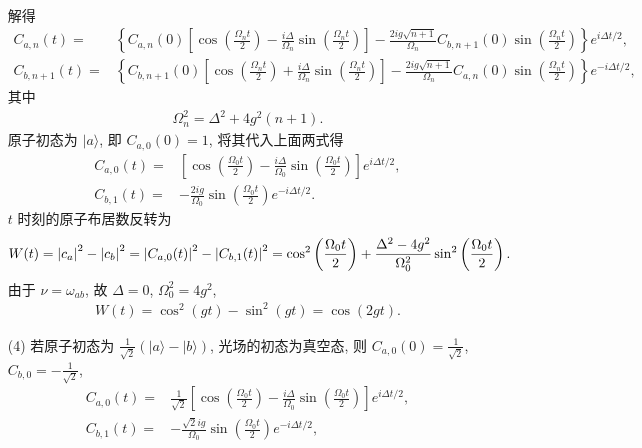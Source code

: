 \documentclass{assignment}
\begin{document}
\begin{sol}
\begin{itemize}
\begin{align}
        \end{align}
        解得
        \begin{align}
            C_{a,n}(t)=&\left\{C_{a,n}(0)\left[\cos\left(\frac{\Omega_nt}{2}\right)-\frac{i\Delta}{\Omega_n}\sin\left(\frac{\Omega_nt}{2}\right)\right]-\frac{2ig\sqrt{n+1}}{\Omega_n}C_{b,n+1}(0)\sin\left(\frac{\Omega_nt}{2}\right)\right\}e^{i\Delta t/2},\\
            C_{b,n+1}(t)=&\left\{C_{b,n+1}(0)\left[\cos\left(\frac{\Omega_nt}{2}\right)+\frac{i\Delta}{\Omega_n}\sin\left(\frac{\Omega_nt}{2}\right)\right]-\frac{2ig\sqrt{n+1}}{\Omega_n}C_{a,n}(0)\sin\left(\frac{\Omega_nt}{2}\right)\right\}e^{-i\Delta t/2},
        \end{align}
        其中
        \begin{align}
            \Omega_n^2=\Delta^2+4g^2(n+1).
        \end{align}
        原子初态为 $\lvert a\rangle$, 即 $C_{a,0}(0)=1$, 将其代入上面两式得
        \begin{align}
            C_{a,0}(t)=&\left[\cos\left(\frac{\Omega_0t}{2}\right)-\frac{i\Delta}{\Omega_0}\sin\left(\frac{\Omega_0t}{2}\right)\right]e^{i\Delta t/2},\\
            C_{b,1}(t)=&-\frac{2ig}{\Omega_0}\sin\left(\frac{\Omega_0t}{2}\right)e^{-i\Delta t/2}.
        \end{align}
        $t$ 时刻的原子布居数反转为
        \begin{align}
            W(t)=\left\lvert c_a\right\rvert^2-\left\lvert c_b\right\rvert^2=\left\lvert C_{a,0}(t)\right\rvert^2-\left\lvert C_{b,1}(t)\right\rvert^2=\cos^2\left(\frac{\Omega_0t}{2}\right)+\frac{\Delta^2-4g^2}{\Omega_0^2}\sin^2\left(\frac{\Omega_0t}{2}\right).
        \end{align}
        由于 $\nu=\omega_{ab}$, 故 $\Delta=0$, $\Omega_0^2=4g^2$,
        \begin{align}
            W(t)=\cos^2(gt)-\sin^2(gt)=\cos(2gt).
        \end{align}
        \item[(4)] 若原子初态为 $\frac{1}{\sqrt{2}}(\lvert a\rangle-\lvert b\rangle)$, 光场的初态为真空态, 则 $C_{a,0}(0)=\frac{1}{\sqrt{2}}$, $C_{b,0}=-\frac{1}{\sqrt{2}}$,
        \begin{align}
            C_{a,0}(t)=&\frac{1}{\sqrt{2}}\left[\cos\left(\frac{\Omega_0t}{2}\right)-\frac{i\Delta}{\Omega_0}\sin\left(\frac{\Omega_0t}{2}\right)\right]e^{i\Delta t/2},\\
            C_{b,1}(t)=&-\frac{\sqrt{2}ig}{\Omega_0}\sin\left(\frac{\Omega_0t}{2}\right)e^{-i\Delta t/2},\\

\end{align}
\end{itemize}
\end{sol}
\end{document}
